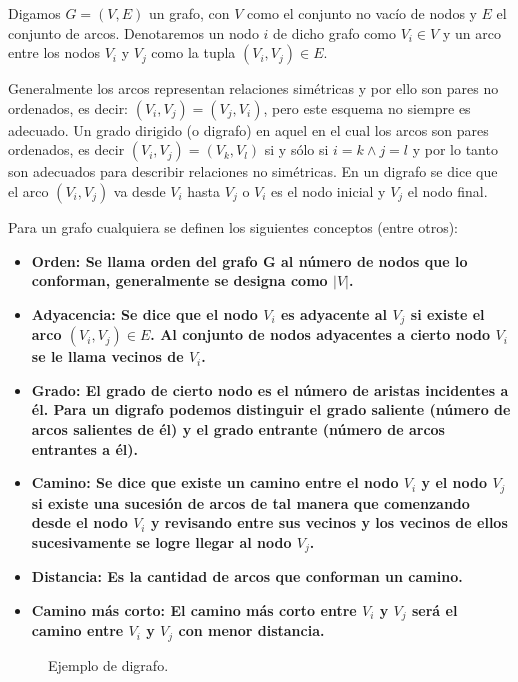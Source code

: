 Digamos $G=(V, E)$ un grafo, con $V$ como el conjunto no vacío de nodos y $E$ el
conjunto de arcos.
Denotaremos un nodo $i$ de dicho grafo como  $V_i \in V$ y un arco entre los
nodos $V_i$ y $V_j$ como la tupla $(V_i, V_j) \in E$.

Generalmente los arcos representan relaciones simétricas y por ello son pares no
ordenados, es decir: $(V_i, V_j) = (V_j, V_i)$, pero este esquema no siempre es
adecuado. Un grado dirigido (o digrafo) en aquel en el cual los arcos son pares
ordenados, es decir $(V_i, V_j) = (V_k, V_l)$ si y sólo si $i=k \land j=l$ y por
lo tanto son adecuados para describir relaciones no simétricas. En un digrafo se
dice que el arco $(V_i, V_j)$ va desde $V_i$ hasta $V_j$ o $V_i$ es el nodo
inicial y $V_j$ el nodo final.

Para un grafo cualquiera se definen los siguientes conceptos (entre otros):
\begin{itemize}
  \item \bf{Orden:}
    Se llama orden del grafo G al número de nodos que lo conforman, generalmente
    se designa como $|V|$.
  \item \bf{Adyacencia:}
    Se dice que el nodo $V_i$ es adyacente al $V_j$ si existe el arco 
    $(V_i, V_j) \in E$. Al conjunto de nodos adyacentes a cierto nodo $V_i$ se
    le llama \bf{vecinos} de $V_i$.
  \item \bf{Grado:}
    El grado de cierto nodo es el número de aristas incidentes a él. Para un
    digrafo podemos distinguir el grado saliente (número de arcos salientes de
    él) y el grado entrante (número de arcos entrantes a él).
  \item \bf{Camino:}
    Se dice que existe un camino entre el nodo $V_i$ y el nodo $V_j$ si existe
    una sucesión de arcos de tal manera que comenzando desde el nodo $V_i$ y
    revisando entre sus vecinos y los vecinos de ellos sucesivamente se logre
    llegar al nodo $V_j$.
  \item \bf{Distancia:}
    Es la cantidad de arcos que conforman un camino.
  \item \bf{Camino más corto:}
    El camino más corto entre $V_i$ y $V_j$ será el camino entre $V_i$ y $V_j$
    con menor distancia.
\end{itemize}

\begin{figure}[htpb]
  \centering
  
  \caption{Ejemplo de digrafo.}
  \label{fig:exgraph}
\end{figure}

